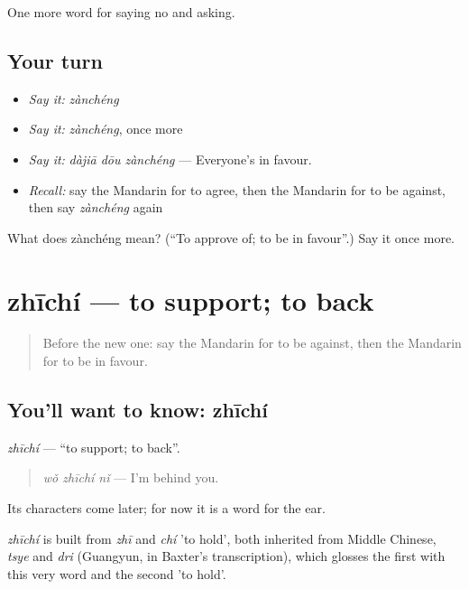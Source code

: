 \begin{grammarlens}[title={What you've built}]
One more word for saying no and asking.
\end{grammarlens}

\subsection*{Your turn}
\begin{itemize}
\raggedright
  \item \emph{Say it:} \emph{zànchéng}
  \item \emph{Say it:} \emph{zànchéng}, once more
  \item \emph{Say it:} \emph{dàjiā dōu zànchéng} — Everyone's in favour.
  \item \emph{Recall:} say the Mandarin for to agree, then the Mandarin for to be against, then say \emph{zànchéng} again
\end{itemize}

\begin{tcolorbox}[breakable,colback=teal!4,colframe=teal!35!black,title={Before you move on}]
What does zànchéng mean? (\textquotedblleft{}To approve of; to be in favour\textquotedblright{}.) Say it once more.
\end{tcolorbox}
\section[zhīchí]{zhīchí — to support; to back}

\label{lesson:ZH-C270-zhichi}



\begin{quote}
Before the new one: say the Mandarin for to be against, then the Mandarin for to be in favour.
\end{quote}

\subsection*{You'll want to know: zhīchí}
\emph{zhīchí} — \textquotedblleft{}to support; to back\textquotedblright{}.

\begin{quote}
\emph{wǒ zhīchí nǐ} — I'm behind you.
\end{quote}

Its characters come later; for now it is a word for the ear.

\begin{cousinweb}
\emph{zhīchí} is built from \emph{zhī} and \emph{chí} 'to hold', both inherited from Middle Chinese, \emph{tsye} and \emph{dri} (Guangyun, in Baxter's transcription), which glosses the first with this very word and the second 'to hold'.
\end{cousinweb}


